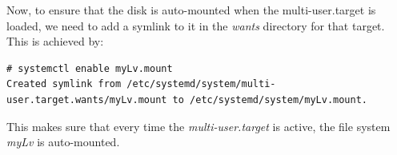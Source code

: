 \noindent
Now, to ensure that the disk is auto-mounted when the multi-user.target is loaded, we need to add a symlink to it in the \textit{wants} directory for that target. This is achieved by:

\vspace{-15pt}
\begin{verbatim}
# systemctl enable myLv.mount 
Created symlink from /etc/systemd/system/multi-user.target.wants/myLv.mount to /etc/systemd/system/myLv.mount.
\end{verbatim}
\vspace{-10pt}

\noindent
This makes sure that every time the \textit{multi-user.target} is active, the file system \textit{myLv} is auto-mounted. 
